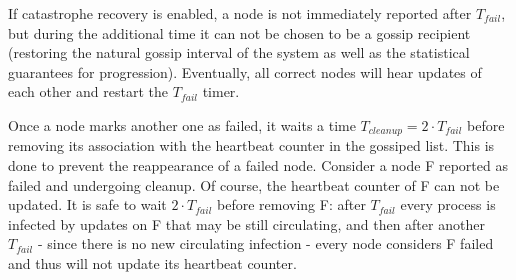 If catastrophe recovery is enabled, a node is not immediately reported after $T_{fail}$, but during the additional time it can not be chosen to be a gossip recipient (restoring the natural gossip interval of the system as well as the statistical guarantees for progression).
Eventually, all correct nodes will hear updates of each other and restart the $T_{fail}$ timer.

Once a node marks another one as failed, it waits a time $T_{cleanup} = 2 \cdot T_{fail}$ before removing its association with the heartbeat counter in the gossiped list.
This is done to prevent the reappearance of a failed node.
Consider a node F reported as failed and undergoing cleanup.
Of course, the heartbeat counter of F can not be updated.
It is safe to wait $2 \cdot T_{fail}$ before removing F:
after $T_{fail}$ every process is infected by updates on F that may be still circulating, and then after another $T_{fail}$ - since there is no new circulating infection - every node considers F failed and thus will not update its heartbeat counter.
